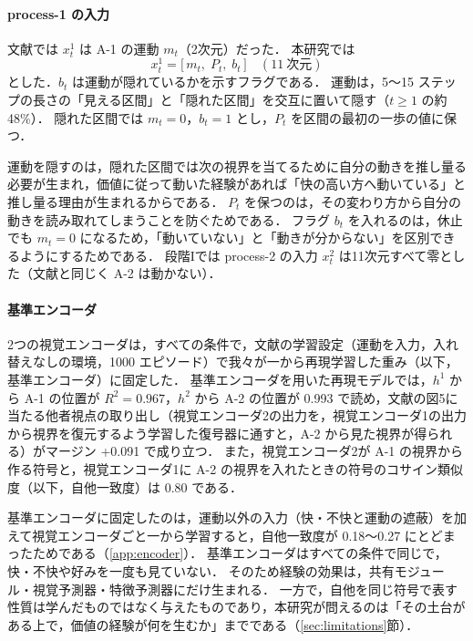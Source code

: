 \paragraph{process-1 の入力}
文献\cite{noguchi2022superposition}では $x^1_t$ は A-1 の運動 $m_t$（2次元）だった．
本研究では
\begin{equation}
  x^1_t = \bigl[\, m_t,\; P_t,\; b_t \,\bigr] \quad (11\ \text{次元})
\end{equation}
とした．$b_t$ は運動が隠れているかを示すフラグである．
運動は，5〜15 ステップの長さの「見える区間」と「隠れた区間」を交互に置いて隠す（$t\ge1$ の約48\%）．
隠れた区間では $m_t=0$，$b_t=1$ とし，$P_t$ を区間の最初の一歩の値に保つ．

運動を隠すのは，隠れた区間では次の視界を当てるために自分の動きを推し量る必要が生まれ，価値に従って動いた経験があれば「快の高い方へ動いている」と推し量る理由が生まれるからである．
$P_t$ を保つのは，その変わり方から自分の動きを読み取れてしまうことを防ぐためである．
フラグ $b_t$ を入れるのは，休止でも $m_t=0$ になるため，「動いていない」と「動きが分からない」を区別できるようにするためである．
段階Iでは process-2 の入力 $x^2_t$ は11次元すべて零とした（文献\cite{noguchi2022superposition}と同じく A-2 は動かない）．

\paragraph{基準エンコーダ}
2つの視覚エンコーダは，すべての条件で，文献\cite{noguchi2022superposition}の学習設定（運動を入力，入れ替えなしの環境，1000 エピソード）で我々が一から再現学習した重み（以下，基準エンコーダ）に固定した．
基準エンコーダを用いた再現モデルでは，$h^1$ から A-1 の位置が $R^2=0.967$，$h^2$ から A-2 の位置が 0.993 で読め，文献\cite{noguchi2022superposition}の図5に当たる他者視点の取り出し（視覚エンコーダ2の出力を，視覚エンコーダ1の出力から視界を復元するよう学習した復号器に通すと，A-2 から見た視界が得られる）がマージン +0.091 で成り立つ．
また，視覚エンコーダ2が A-1 の視界から作る符号と，視覚エンコーダ1に A-2 の視界を入れたときの符号のコサイン類似度（以下，自他一致度）は 0.80 である．

基準エンコーダに固定したのは，運動以外の入力（快・不快と運動の遮蔽）を加えて視覚エンコーダごと一から学習すると，自他一致度が 0.18〜0.27 にとどまったためである（\ref{app:encoder}）．
基準エンコーダはすべての条件で同じで，快・不快や好みを一度も見ていない．
そのため経験の効果は，共有モジュール・視覚予測器・特徴予測器にだけ生まれる．
一方で，自他を同じ符号で表す性質は学んだものではなく与えたものであり，本研究が問えるのは「その土台がある上で，価値の経験が何を生むか」までである（\ref{sec:limitations}節）．

